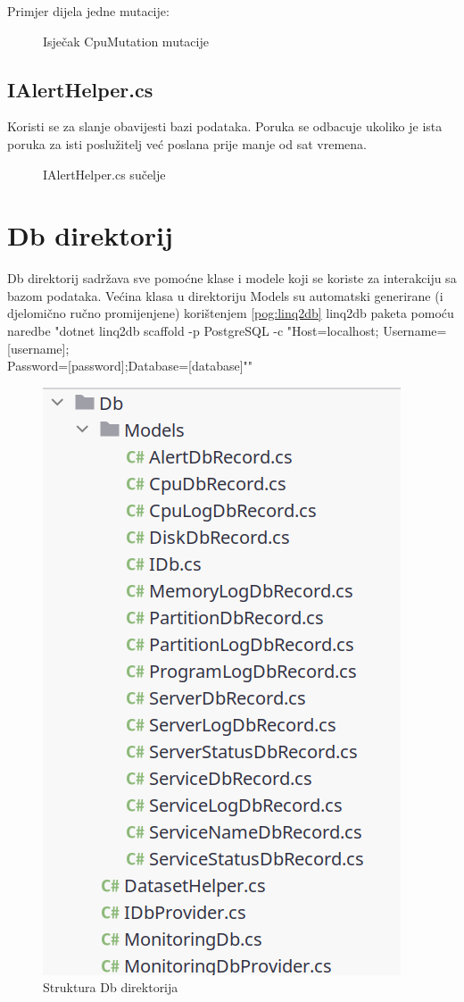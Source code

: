 \documentclass[zavrsnirad]{fer}
\begin{document}
Primjer dijela jedne mutacije:
\begin{figure}[htb]
	\centering
	
	\caption{Isječak CpuMutation mutacije}
\end{figure}
\FloatBarrier

\subsection{IAlertHelper.cs}
Koristi se za slanje obavijesti bazi podataka. Poruka se odbacuje ukoliko je ista poruka za isti poslužitelj već poslana prije manje od sat vremena.

\begin{figure}[htb]
	\centering
	
	\caption{IAlertHelper.cs sučelje}
\end{figure}
\FloatBarrier

\section{Db direktorij}
\label{pog:db_dir}
Db direktorij sadržava sve pomoćne klase i modele koji se koriste za interakciju sa bazom podataka. Većina klasa u direktoriju Models su automatski generirane (i djelomično ručno promijenjene) korištenjem \ref{pog:linq2db} linq2db paketa pomoću naredbe "dotnet linq2db scaffold -p PostgreSQL -c "Host=localhost; Username=[username];\\Password=[password];Database=[database]""

\begin{figure}[htb!]
	\centering
	\includegraphics[width=0.5\linewidth]{images/db_dir_structure.png} 
	\caption{Struktura Db direktorija}
	\label{slk:db_dir_structure}
\end{figure}
\FloatBarrier
\end{document}
